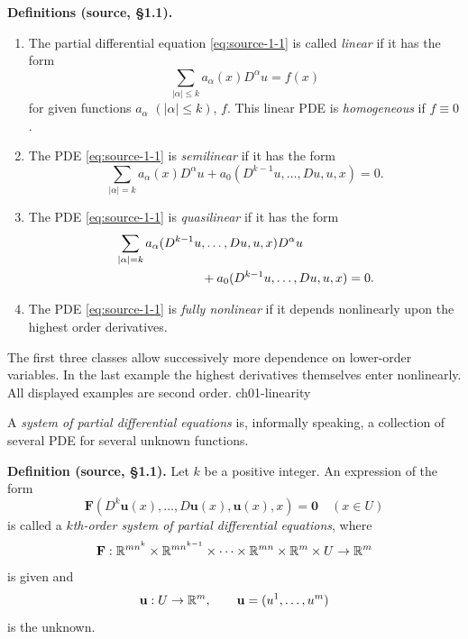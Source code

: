 \noindent\textbf{Definitions (source, \S1.1).}
\begin{enumerate}[label=(\roman*)]
\item The partial differential equation \eqref{eq:source-1-1} is called
\emph{linear} if it has the form
\[
 \sum_{|\alpha|\leq k}a_\alpha(x)D^\alpha u=f(x)
\]
for given functions $a_\alpha$ $(|\alpha|\leq k)$, $f$. This linear PDE is
\emph{homogeneous} if $f\equiv0$.
\item The PDE \eqref{eq:source-1-1} is \emph{semilinear} if it has the form
\[
 \sum_{|\alpha|=k}a_\alpha(x)D^\alpha u
 +a_0(D^{k-1}u,\ldots,Du,u,x)=0.
\]
\item The PDE \eqref{eq:source-1-1} is \emph{quasilinear} if it has the form
\begin{align*}
 &\sum_{|\alpha|=k}a_\alpha(D^{k-1}u,\ldots,Du,u,x)D^\alpha u\\
 &\hspace{24mm}+a_0(D^{k-1}u,\ldots,Du,u,x)=0.
\end{align*}
\item The PDE \eqref{eq:source-1-1} is \emph{fully nonlinear} if it depends
nonlinearly upon the highest order derivatives.
\end{enumerate}
\par\Needspace{65mm}


{The first three classes allow successively more dependence on lower-order variables. In the last example the highest derivatives themselves enter nonlinearly. All displayed examples are second order.}
{ch01-linearity}

A \emph{system of partial differential equations} is, informally speaking,
a collection of several PDE for several unknown functions.

\noindent\textbf{Definition (source, \S1.1).}
Let $k$ be a positive integer. An expression of the form
\begingroup
\renewcommand{\theequation}{\arabic{equation}}
\begin{equation}
 \mathbf F(D^k\mathbf u(x),\ldots,D\mathbf u(x),\mathbf u(x),x)=\mathbf0
 \quad(x\in U)
 \label{eq:source-1-2}
\end{equation}
\endgroup
is called a \emph{$k$th-order system of partial differential equations}, where
\[
 \mathbf F:\mathbb{R}^{mn^k}\times\mathbb{R}^{mn^{k-1}}\times\cdots
 \times\mathbb{R}^{mn}\times\mathbb{R}^m\times U\to\mathbb{R}^m
\]
is given and
\[
 \mathbf u:U\to\mathbb{R}^m,\qquad \mathbf u=(u^1,\ldots,u^m)
\]
is the unknown.


